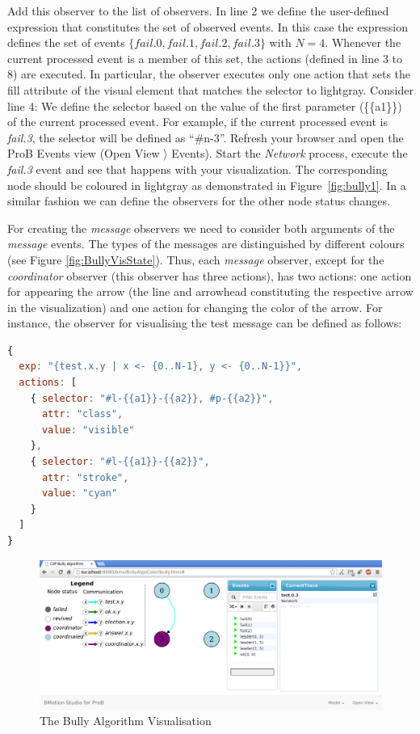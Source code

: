 Add this observer to the list of observers.
In line 2 we define the user-defined expression that constitutes the set of observed events.
In this case the expression defines the set of events $\{fail.0, fail.1, fail.2, fail.3\}$ with $N=4$.
Whenever the current processed event is a member of this set, the actions (defined in line 3 to 8) are executed.
In particular, the observer executes only one action that sets the fill attribute of the visual element that matches the selector to lightgray.
Consider line 4: We define the selector based on the value of the first parameter (\{\{a1\}\}) of the current processed event.
For example, if the current processed event is \textit{fail.3}, the selector will be defined as ``\#n-3''.
Refresh your browser and open the ProB Events view (\textsf{Open View $\rangle$ Events}).
Start the \textit{Network} process, execute the \textit{fail.3} event and see that happens with your visualization.
The corresponding node should be coloured in lightgray as demonstrated in Figure~\ref{fig:bully1}.
In a similar fashion we can define the observers for the other node status changes. 

For creating the \textit{message} observers we need to consider both arguments of the \textit{message} events.
The types of the messages are distinguished by different colours (see Figure \ref{fig:BullyVisState}).
Thus, each \textit{message} observer, except for the \textit{coordinator} observer (this observer has three actions), has two actions: one action for appearing the arrow (the line and arrowhead constituting the respective arrow in the visualization) and one action for changing the color of the arrow.
For instance, the observer for visualising the test message can be defined as follows:

\begin{lstlisting}[language=JavaScript]
{
  exp: "{test.x.y | x <- {0..N-1}, y <- {0..N-1}}",
  actions: [
    { selector: "#l-{{a1}}-{{a2}}, #p-{{a2}}",
      attr: "class",
      value: "visible"
    },
    { selector: "#l-{{a1}}-{{a2}}",
      attr: "stroke",
      value: "cyan"
    }
  ]
}
\end{lstlisting}

\begin{figure}[h!]\centering
	\includegraphics[width=16cm]{img/tutorial/bully2}
	\caption{The Bully Algorithm Visualisation}
	\label{fig:bully2}
\end{figure}

